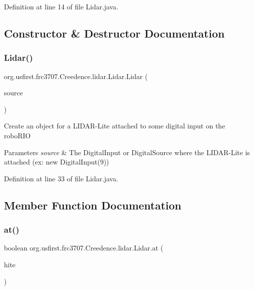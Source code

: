 Definition at line 14 of file Lidar.\+java.



\subsection{Constructor \& Destructor Documentation}
\mbox{\label{classorg_1_1usfirst_1_1frc3707_1_1_creedence_1_1lidar_1_1_lidar_a0971ae3017d0e24dbebe0b80a3ac24b6}} 
\subsubsection{\texorpdfstring{Lidar()}{Lidar()}}
{\footnotesize\ttfamily org.\+usfirst.\+frc3707.\+Creedence.\+lidar.\+Lidar.\+Lidar (\begin{DoxyParamCaption}\item[{Digital\+Source}]{source }\end{DoxyParamCaption})}

Create an object for a L\+I\+D\+A\+R-\/\+Lite attached to some digital input on the robo\+R\+IO


\begin{DoxyParams}{Parameters}
{\em source} & The Digital\+Input or Digital\+Source where the L\+I\+D\+A\+R-\/\+Lite is attached (ex\+: new Digital\+Input(9)) \\
\hline
\end{DoxyParams}


Definition at line 33 of file Lidar.\+java.



\subsection{Member Function Documentation}
\mbox{\label{classorg_1_1usfirst_1_1frc3707_1_1_creedence_1_1lidar_1_1_lidar_afaacc8fb2b3924c90c4ffc880b8bff93}} 
\subsubsection{\texorpdfstring{at()}{at()}}
{\footnotesize\ttfamily boolean org.\+usfirst.\+frc3707.\+Creedence.\+lidar.\+Lidar.\+at (\begin{DoxyParamCaption}\item[{double}]{hite }\end{DoxyParamCaption})}



